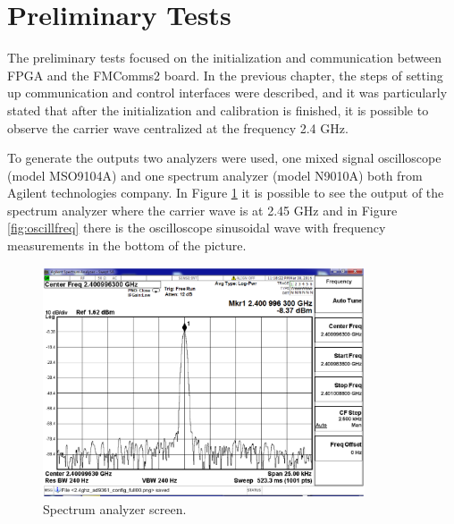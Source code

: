 \vfill
\clearpage

\section{Preliminary Tests}
\label{result:conf}

The preliminary tests focused on the initialization and communication between
FPGA and the FMComms2 board. In the previous chapter, the steps of setting up
communication and control interfaces were described, and it was particularly
stated that after the initialization and calibration is finished, it is possible
to observe the carrier wave centralized at the frequency 2.4 GHz.

To generate the outputs two analyzers were used, one mixed signal oscilloscope
(model MSO9104A) and one spectrum analyzer (model N9010A) both from Agilent
technologies company. In Figure \ref{fig:spec} it is possible to see the output
of the spectrum analyzer where the carrier wave is at 2.45 GHz and in Figure
\ref{fig:oscillfreq} there is the oscilloscope sinusoidal wave with frequency
measurements in the bottom of the picture.

\begin{figure}[htbp]
    \centering
    \includegraphics[width=0.85\textwidth]{./figures/spectrum_init}
    \caption{ Spectrum analyzer screen.
    \label{fig:spec}}
\end{figure}



